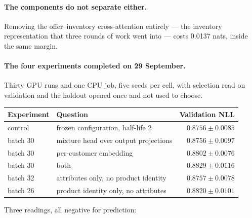 \documentclass[11pt]{article}
\begin{document}
\paragraph{The components do not separate either.} Removing the offer--inventory
cross-attention
entirely --- the inventory representation that three rounds of work went into
--- costs 0.0137 nats, inside the same margin.

\paragraph{The four experiments completed on 29 September.} Thirty GPU runs and
one CPU job, five seeds per cell, with selection read on validation and the
holdout opened once and not used to choose.

\begin{center}\small
\begin{tabular}{llr}
\toprule
Experiment & Question & Validation NLL \\
\midrule
control & frozen configuration, half-life 2 & $0.8756 \pm 0.0085$ \\
batch 30 & mixture head over output projections & $0.8756 \pm 0.0097$ \\
batch 30 & per-customer embedding & $0.8802 \pm 0.0076$ \\
batch 30 & both & $0.8829 \pm 0.0116$ \\
batch 32 & attributes only, no product identity & $0.8757 \pm 0.0078$ \\
batch 26 & product identity only, no attributes & $0.8820 \pm 0.0101$ \\
\bottomrule
\end{tabular}
\end{center}

\noindent Three readings, all negative for prediction:
\end{document}
